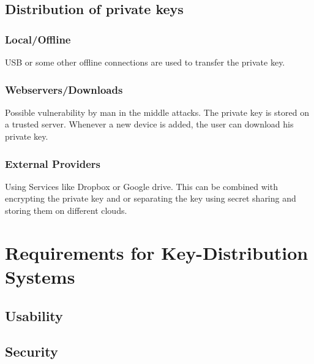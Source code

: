 \documentclass[12pt,oneside,a4paper,parskip]{scrbook}
\begin{document}
\section{Distribution of private keys}

\subsection{Local/Offline}

USB or some other offline connections are used to transfer the private key.



\subsection{Webservers/Downloads}

Possible vulnerability by man in the middle attacks.
The private key is stored on a trusted server. Whenever a new device is added, the user can download his private key.

\subsection{External Providers}

Using Services like Dropbox or Google drive. This can be combined with encrypting the private key and or separating the key using secret sharing and 
storing them on different clouds. 




\chapter{Requirements for Key-Distribution Systems}

\section{Usability}

\section{Security}
\end{document}
